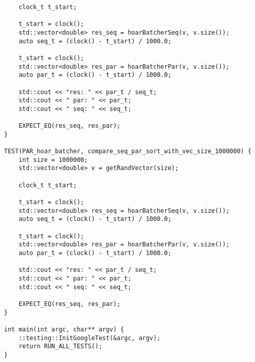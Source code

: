\documentclass{report}
\begin{document}
\begin{lstlisting}
    clock_t t_start;

    t_start = clock();
    std::vector<double> res_seq = hoarBatcherSeq(v, v.size());
    auto seq_t = (clock() - t_start) / 1000.0;

    t_start = clock();
    std::vector<double> res_par = hoarBatcherPar(v, v.size());
    auto par_t = (clock() - t_start) / 1000.0;

    std::cout << "res: " << par_t / seq_t;
    std::cout << " par: " << par_t;
    std::cout << " seq: " << seq_t;

    EXPECT_EQ(res_seq, res_par);
}

TEST(PAR_hoar_batcher, compare_seq_par_sort_with_vec_size_1000000) {
    int size = 1000000;
    std::vector<double> v = getRandVector(size);

    clock_t t_start;

    t_start = clock();
    std::vector<double> res_seq = hoarBatcherSeq(v, v.size());
    auto seq_t = (clock() - t_start) / 1000.0;

    t_start = clock();
    std::vector<double> res_par = hoarBatcherPar(v, v.size());
    auto par_t = (clock() - t_start) / 1000.0;

    std::cout << "res: " << par_t / seq_t;
    std::cout << " par: " << par_t;
    std::cout << " seq: " << seq_t;

    EXPECT_EQ(res_seq, res_par);
}

int main(int argc, char** argv) {
    ::testing::InitGoogleTest(&argc, argv);
    return RUN_ALL_TESTS();
}

\end{lstlisting}
\end{document}
